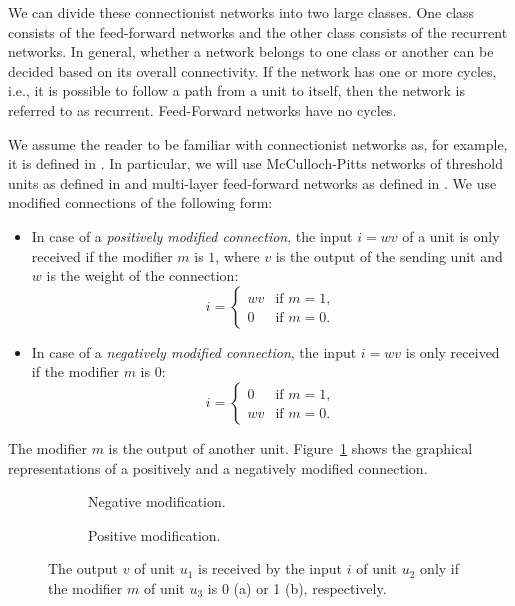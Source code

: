 We can divide these connectionist networks into two large classes. One class consists of the feed-forward networks and the other class consists of the recurrent networks. In general, whether a network belongs to one class or another can be decided based on its overall connectivity. If the network has one or more cycles, i.e., it is possible to follow a path from a unit to itself, then the network is referred to as recurrent. Feed-Forward networks have no cycles. 

We assume the reader to be familiar with connectionist networks as, for example, it is defined in \cite{feldman1982connectionist}. In particular, we will use McCulloch-Pitts networks of threshold units as defined in \cite{mcculloch1943logical} and multi-layer feed-forward networks as defined in \cite{rumelhart1986general}. We use modified connections of the following form:

\begin{itemize}

\item In case of a \textit{positively modified connection}, the input $i = wv$ of a unit is only received if the modifier $m$ is $1$, where $v$ is the output of the sending unit and $w$ is the weight of the connection:
\[
i = \left\{ 
\begin{array}{ll}
wv & \mbox{if } m=1, \\
0   & \mbox{if } m=0.
\end{array}
\right .
\]

\item In case of a \textit{negatively modified connection}, the input $i = wv$  is only received if the modifier $m$ is $0$:
\[
i = \left\{
\begin{array}{ll}
0 & \mbox{if } m=1, \\
wv & \mbox{if } m=0.
\end{array}
\right .
\]
\end{itemize}

The modifier $m$ is the output of another unit. Figure~\ref{fig:modifier} shows the graphical representations of a positively and a negatively modified connection. 

\begin{figure}
	\centering
	\begin{subfigure}{0.45\textwidth}
		\scalebox{.8}{\modifiedconnectionspassive}
  		 \caption{Negative modification.}
	\end{subfigure}
	\hspace{1cm}
	\begin{subfigure}{0.45\textwidth}
		\scalebox{.8}{\modifiedconnectionsactive}
   		\caption{Positive modification.}
	\end{subfigure}
	\caption{The output $v$ of unit $u_1$ is received by the input $i$ of unit $u_2$ only if the modifier $m$ of unit $u_3$ is 0 (a) or 1 (b), respectively.}
	\label{fig:modifier}
\end{figure}

